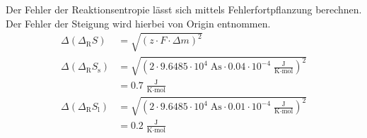 \documentclass[12pt,a4paper,titlepage,headinclude,bibtotoc]{scrartcl}
\begin{document}
Der Fehler der Reaktionsentropie lässt sich mittels Fehlerfortpflanzung berechnen. Der Fehler der Steigung wird hierbei von Origin entnommen. 
\begin{align}
\Delta(\Delta_\text{R}  S)&= \sqrt{(z\cdot F \cdot \Delta m)^2}\\
\Delta(\Delta_\text{R}  S_{\text{s}})&= \sqrt{\left(2\cdot 9.6485 \cdot 10^4\;\text{As} \cdot 0.04 \cdot 10^{-4}\;\frac{\text{J}}{\text{K}\cdot\text{mol}}\right)^2}\\
&= 0.7 \;\frac{\text{J}}{\text{K}\cdot\text{mol}}\\
\Delta(\Delta_\text{R}  S_{\text{l}})&= \sqrt{\left(2\cdot 9.6485 \cdot 10^4\;\text{As} \cdot 0.01\cdot 10^{-4}\;\frac{\text{J}}{\text{K}\cdot\text{mol}}\right)^2}\\
&= 0.2\;\frac{\text{J}}{\text{K}\cdot\text{mol}}
\end{align}
\end{document}
